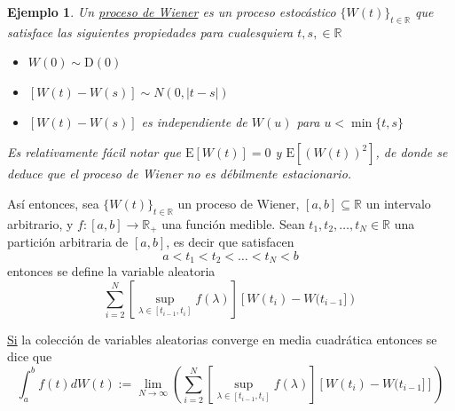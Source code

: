 \documentclass[12pt,letterpaper]{book}
\newtheorem{ejemplo}{Ejemplo}[chapter]
\newcommand{\R}{\mathbb{R}}
\newcommand{\E}[1]{\mathrm{E}\left[ #1 \right]}
\newcommand{\abso}[1]{\left| #1 \right|}
\begin{document}
\begin{ejemplo}
Un \underline{proceso de Wiener} es un proceso estocástico $\{ W(t)\}_{t\in\R}$ que satisface las siguientes propiedades para cualesquiera $t, s, \in \R$
\begin{itemize}
\item $W(0) \sim \text{D}(0)$
\item $\left[W(t)-W(s)\right] \sim N(0, \abso{t-s})$
\item $\left[W(t)-W(s)\right]$ es independiente de $W(u)$ para $u < \min\{ t, s \}$
\end{itemize}

Es relativamente fácil notar que $\E{W(t)} = 0$ y $\E{\left(W(t)\right)^2}$, de donde se deduce que el proceso de Wiener no es débilmente estacionario.
\end{ejemplo}

Así entonces, sea $\{ W(t)\}_{t\in\R}$ un proceso de Wiener, $[a,b]\subseteq\R$ un intervalo arbitrario, y $f:[a,b]\longrightarrow\R_+$ una función medible.
%
Sean $t_1, t_2, \dots, t_N \in \R$ una partición arbitraria de $[a,b]$, es decir que satisfacen
\begin{equation}
a < t_1 < t_2 < \dots < t_N < b
\end{equation}
entonces se define la variable aleatoria
\begin{equation}
\sum_{i=2}^N \left[ \sup_{\lambda \in [t_{i-1},t_i]} f(\lambda) \right] \left[ W(t_i) - W(t_{i-1}] \right)
\end{equation}

\underline{Si} la colección de variables aleatorias converge en media cuadrática entonces se dice que
\begin{equation}
\int_a^b f(t) dW(t) :=
\lim_{N\rightarrow \infty} \left(
\sum_{i=2}^N \left[ \sup_{\lambda \in [t_{i-1},t_i]} f(\lambda) \right] \left[ W(t_i) - W(t_{i-1}] \right] \right)
\end{equation}
\end{document}
